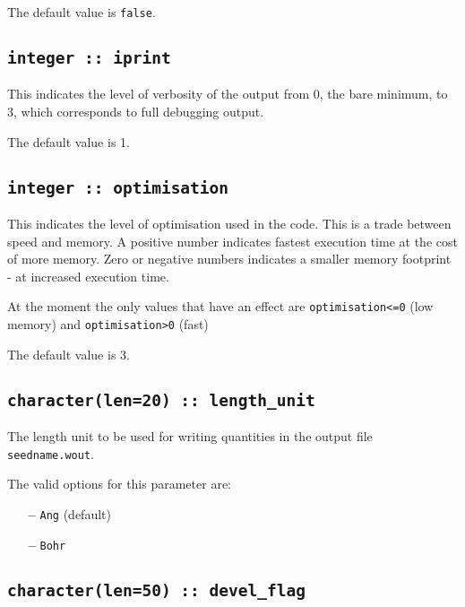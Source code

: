 The default value is \verb#false#.


%


\subsection[iprint]{\tt integer :: iprint}

This indicates the level of verbosity of the output from 0,
the bare minimum, to 3, which corresponds to full debugging output.

The default value is 1.

\subsection[optimisation]{\tt integer :: optimisation}

This indicates the level of optimisation used in the code. This is a 
trade between speed and memory. A positive number indicates fastest execution time at the cost
of more memory. Zero or negative numbers indicates a smaller memory footprint - at increased
execution time. 

At the moment the only values that have an effect are \verb#optimisation<=0# (low memory) and \verb#optimisation>0# (fast)

The default value is 3.



\subsection[length\_unit]{\tt character(len=20) :: length\_unit}
The length unit to be used for writing quantities in the output file
{\tt seedname.wout}.

The valid options for this parameter are:
\begin{itemize}
\item[{\bf --}]  \verb#Ang# (default)
\item[{\bf --}]  \verb#Bohr#
\end{itemize}

\subsection[devel\_flag]{\tt character(len=50) :: devel\_flag}

